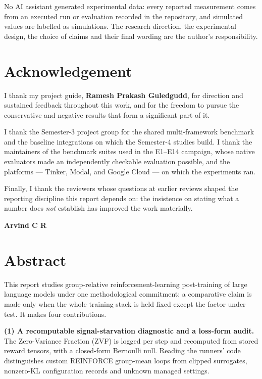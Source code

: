 No AI assistant generated experimental data: every reported measurement comes
from an executed run or evaluation recorded in the repository, and simulated
values are labelled as simulations. The research direction,
the experimental design, the choice of claims and their final wording are the
author's responsibility.

\chapter*{Acknowledgement}
\thispagestyle{plain}

I thank my project guide, \textbf{Ramesh Prakash Guledgudd}, for direction and
sustained feedback throughout this work, and for the freedom to pursue the
conservative and negative results that form a significant part of it.

I thank the Semester-3 project group for the shared multi-framework benchmark
and the baseline integrations on which the Semester-4 studies build. I thank
the maintainers of the benchmark suites used in the E1--E14 campaign, whose
native evaluators made an independently checkable evaluation possible, and the
platforms --- Tinker, Modal, and Google Cloud --- on which the experiments ran.

Finally, I thank the reviewers whose questions at earlier reviews shaped the
reporting discipline this report depends on: the insistence on stating what a
number does \emph{not} establish has improved the work materially.

\vspace{0.3in}
\noindent\textbf{Arvind C R}

\chapter*{Abstract}
\thispagestyle{plain}

This report studies group-relative reinforcement-learning post-training of
large language models under one methodological commitment: a comparative
claim is made only when the whole training stack is held fixed except the
factor under test. It makes four contributions.

\textbf{(1) A recomputable signal-starvation diagnostic and a loss-form
audit.} The Zero-Variance Fraction (ZVF) is logged per step and recomputed
from stored reward tensors, with a closed-form Bernoulli null. Reading the
runners' code distinguishes custom REINFORCE group-mean loops from clipped
surrogates, nonzero-KL configuration records and unknown managed settings.

